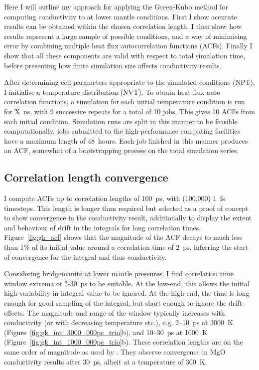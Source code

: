 Here I will outline my approach for applying the Green-Kubo method for computing conductivity to \bdgs at lower mantle conditions. First I show accurate results can be obtained within the chosen correlation length. I then show how results represent a large sample of possible conditions, and a way of minimising error by combining multiple heat flux autocorrelation functions (ACFs). Finally I show that all these components are valid with respect to total simulation time, before presenting how finite simulation size affects conductivity results.

After determining cell parameters appropriate to the simulated conditions (NPT), I initialise a temperature distribution (NVT). To obtain heat flux auto-correlation functions, a simulation for each initial temperature condition is run for X~ns, with 9 successive repeats for a total of 10 jobs. This gives 10 ACFs from each initial condition. Simulation runs are split in this manner to be feasible computationally, jobs submitted to the high-performance computing facilities have a maximum length of 48~hours. Each job finished in this manner produces an ACF, somewhat of a bootstrapping process on the total simulation series.

\subsection{\label{sec:3.GK.cor}Correlation length convergence}

I compute ACFs up to correlation lengths of 100~ps, with (100,000) 1~fs timesteps. This length is longer than required but selected as a proof of concept to show convergence in the conductivity result, additionally to display the extent and behaviour of drift in the integrals for long correlation times. Figure~\ref{fig:gk_acf} shows that the magnitude of the ACF decays to much less than 1\% of its initial value around a correlation time of 2~ps, inferring the start of convergence for the integral and thus conductivity.

Considering bridgemanite at lower mantle pressures, I find correlation time window extrema of 2-30~ps to be suitable. At the low-end, this allows the initial high-variability in integral value to be ignored. At the high-end, the time is long enough for good sampling of the integral, but short enough to ignore the drift-effects. The magnitude and range of the window typically increases with conductivity (or with decreasing temperature etc.), e.g. 2--10~ps at 3000~K (Figure~\ref{fig:gk_int_3000_000pc_trio}b), and 10--30~ps at 1000~K (Figure~\ref{fig:gk_int_1000_000pc_trio}b). These correlation lengths are on the same order of magnitude as used by \citet{Haigis2012}. They observe convergence in MgO conductivity results after 30~ps, albeit at a temperature of 300~K. %

